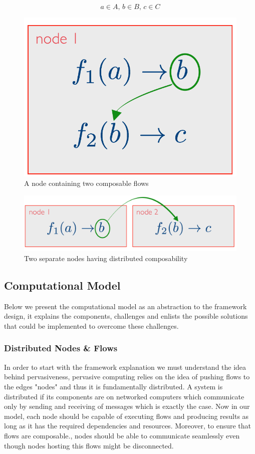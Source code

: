 \[a \in A, \, b \in B, \, c \in C\]
\begin{figure}[H]
	\centering
	\includegraphics[scale=0.3]{images/local-compose.png} 
 	\caption{A node containing two composable flows}
	\label{fig:compose}
\end{figure}
\begin{figure}[H]
	\centering
	\includegraphics[scale=0.4]{images/distributed-compose.png}
	\caption{Two separate nodes having distributed composability}
	\label{fig:compose2}
\end{figure}


\subsection{Computational Model}

Below we present the computational model as an abstraction to the framework design, it explains the components, challenges and enlists the possible solutions that could be implemented to overcome these challenges. 	

\subsubsection{Distributed Nodes \& Flows}
In order to start with the framework explanation we must understand the idea behind pervasiveness, pervasive computing relies on the idea of pushing flows to the edges "nodes" and thus it is fundamentally distributed. A system is distributed if its components  are on networked computers which communicate only by sending and receiving of messages \cite{DSYS} which is exactly the case. Now in our model, each node should be capable of executing flows and producing results as long as it  has the required dependencies and resources. Moreover, to ensure that flows are composable., nodes should be able to communicate seamlessly even though nodes hosting this flows might be disconnected.


